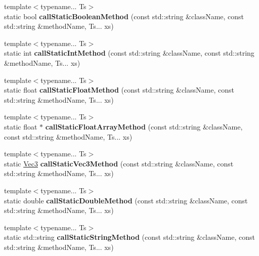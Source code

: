 \begin{DoxyCompactItemize}
\item 
\mbox{\label{classJniHelper_abe141f8f565c0852058f9c08952b5eac}} 
{\footnotesize template$<$typename... Ts$>$ }\\static bool {\bfseries call\+Static\+Boolean\+Method} (const std\+::string \&class\+Name, const std\+::string \&method\+Name, Ts... xs)
\item 
\mbox{\label{classJniHelper_a91319243246966249a5b5ff3b1110f5a}} 
{\footnotesize template$<$typename... Ts$>$ }\\static int {\bfseries call\+Static\+Int\+Method} (const std\+::string \&class\+Name, const std\+::string \&method\+Name, Ts... xs)
\item 
\mbox{\label{classJniHelper_a67019482bf6cae8f91a828ab6372c7bb}} 
{\footnotesize template$<$typename... Ts$>$ }\\static float {\bfseries call\+Static\+Float\+Method} (const std\+::string \&class\+Name, const std\+::string \&method\+Name, Ts... xs)
\item 
\mbox{\label{classJniHelper_ad3f793ae3cab1bfd61fc97fa4c4d2e65}} 
{\footnotesize template$<$typename... Ts$>$ }\\static float $\ast$ {\bfseries call\+Static\+Float\+Array\+Method} (const std\+::string \&class\+Name, const std\+::string \&method\+Name, Ts... xs)
\item 
\mbox{\label{classJniHelper_a9388a9c8636e4583b73ba913dfae9751}} 
{\footnotesize template$<$typename... Ts$>$ }\\static \hyperlink{classVec3}{Vec3} {\bfseries call\+Static\+Vec3\+Method} (const std\+::string \&class\+Name, const std\+::string \&method\+Name, Ts... xs)
\item 
\mbox{\label{classJniHelper_a1a1bfc8c89a94a3ca24c2752f2123283}} 
{\footnotesize template$<$typename... Ts$>$ }\\static double {\bfseries call\+Static\+Double\+Method} (const std\+::string \&class\+Name, const std\+::string \&method\+Name, Ts... xs)
\item 
\mbox{\label{classJniHelper_a1b3bdf85d19fe5e8a54dff67a42720da}} 
{\footnotesize template$<$typename... Ts$>$ }\\static std\+::string {\bfseries call\+Static\+String\+Method} (const std\+::string \&class\+Name, const std\+::string \&method\+Name, Ts... xs)

\end{DoxyCompactItemize}
